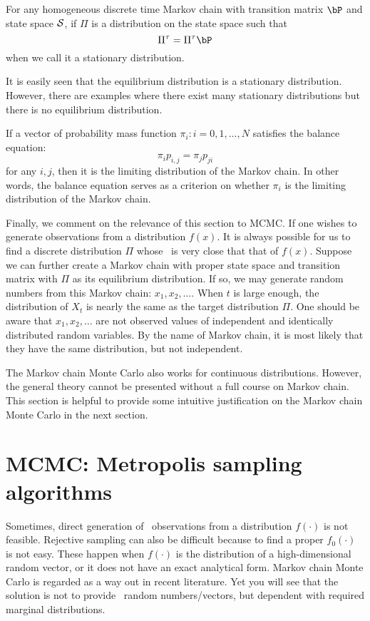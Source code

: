 \begin{defi}
For any homogeneous discrete time Markov chain with
transition matrix $\bP$ and state space ${\cal S}$, if $\Pi$
is a distribution on the state space such that
\[
\Pi^\tau = \Pi^\tau \bP
\]
when we call it a stationary distribution.
\end{defi}

It is easily seen that the equilibrium distribution is a stationary distribution.
However, there are examples where there exist many stationary distributions
but there is no equilibrium distribution.

If a vector of probability mass function $\pi_i: i =0, 1, \ldots, N$ satisfies
the balance equation:
\[
\pi_i p_{i,j} = \pi_j p_{ji}
\]
for any $i, j$, then it is the limiting distribution of the Markov chain.
In other words, the balance equation serves as a criterion on whether
$\pi_i$ is the limiting distribution of the Markov chain.


Finally, we comment on the relevance of this section to MCMC.
If one wishes to generate observations from a distribution $f(x)$.
It is always possible for us to find a discrete distribution $\Pi$
whose \pmf\ is very close that that of $f(x)$. Suppose we can further create
a Markov chain with proper state space and transition matrix with
$\Pi$ as its equilibrium distribution. If so, we may generate random
numbers from this Markov chain: $x_1, x_2, \ldots$. When $t$ is
large enough, the distribution of $X_t$ is nearly the same as the
target distribution $\Pi$. One should be aware that $x_1, x_2, \ldots$
are not observed values of independent and identically distributed
random variables. By the name of Markov chain, it is most likely
that they have the same distribution, but not independent.

The Markov chain Monte Carlo also works for continuous distributions.
However, the general theory cannot be presented without a full
course on Markov chain. This section is helpful to provide some
intuitive justification on the Markov chain Monte Carlo in the
next section.

\section{MCMC: Metropolis sampling algorithms}
Sometimes, direct generation of \iid\ observations from a distribution $f(\cdot)$
is not feasible. Rejective sampling can also be difficult because
to find a proper $f_0(\cdot)$ is not easy.
These happen when $f(\cdot)$ is the distribution of a
high-dimensional random vector, or it does not have an exact analytical
form. Markov chain Monte Carlo is regarded as a way out
in recent literature. Yet you will see that the solution is not to
provide \iid\ random numbers/vectors, but dependent
with required marginal distributions.

